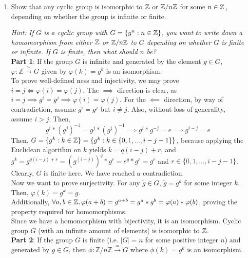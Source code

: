 \documentclass{amsart}
\begin{document}
\begin{enumerate}[itemsep=0.4in]
\item Show that any cyclic group is isomorphic to $\mathbb{Z}$ or $\mathbb{Z}/n\mathbb{Z}$ for some $n\in\mathbb{Z}$, depending on whether the group is infinite or finite.

\emph{Hint: If $G$ is a cyclic group with $G = \{g^n:n\in\mathbb{Z}\}$, you want to write down a homomorphism from either $\mathbb{Z}$ or $\mathbb{Z}/n\mathbb{Z}$ to $G$ depending on whether $G$ is finite or infinite. If $G$ is finite, then what should $n$ be?}\\

\textbf{Part 1}: If the group $G$ is infinite and generated by the element $g\in G$, $\varphi:\mathbb{Z}\xrightarrow{\simeq} G$ given by $\varphi(k)=g^k$ is an isomorphism. \\

To prove well-defined ness and injectivity, we may prove $i=j\iff\varphi(i)=\varphi(j)$. The $\implies$ direction is clear, as $i=j\implies g^i=g^j\implies\varphi(i)=\varphi(j)$. For the $\impliedby$ direction, by way of contradiction, assume $g^i=g^j$ but $i\neq j$. Also, without loss of generality, assume $i>j$.
Then, $$g^i*(g^j)^{-1}=g^j*(g^j)^{-1}\implies g^i*g^{-j}=e\implies g^{i-j}=e$$
Then, $G=\{g^k:k\in\mathbb{Z}\}=\{g^k:k\in\{0,1,...,i-j-1\}\}$, because applying the Euclidean algorithm on $k$ yields $k=q(i-j)+r$, and $g^k=g^{q(i-j)+r}=(g^{(i-j)})^q*g^r=e^q*g^r=g^r$ and $r\in\{0,1,...,i-j-1\}$. Clearly, $G$ is finite here. We have reached a contradiction.\\

Now we want to prove surjectivity. For any $\tilde g\in G$, $\tilde g=g^k$ for some integer $k$. Then, $\varphi(k)=g^k=\tilde g$.\\

Additionally, $\forall a,b\in\mathbb{Z},\varphi(a+b)=g^{a+b}=g^a*g^b=\varphi(a)*\varphi(b)$, proving the property required for homomorphisms.\\

Since we have a homomorphism with bijectivity, it is an isomorphism. Cyclic group $G$ (with an infinite amount of elements) is isomorphic to $\mathbb{Z}$.\\

\textbf{Part 2}: If the group $G$ is finite (i.e. $|G|=n$ for some positive integer $n$) and generated by $g\in G$, then $\phi:\mathbb{Z}/n\mathbb{Z}\xrightarrow{\simeq} G$ where $\phi(k)=g^k$ is an isomorphism.\\


\end{enumerate}
\end{document}
